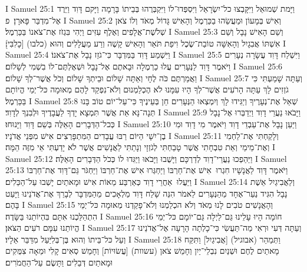 I Samuel 25:1	וַיָּמת שְׁמוּאֵל וַיִּקָּבְצוּ כל־יִשְׂרָאֵל וַיִּסְפְּדוּ־לוֹ וַיִּקְבְּרֻהוּ בְּבֵיתוֹ בָּרָמָה וַיָּקם דָּוִד וַיֵּרֶד אֶל־מִדְבַּר פָּארָן׃ {פ}
I Samuel 25:2	וְאִישׁ בְּמָעוֹן וּמַעֲשֵׂהוּ בַכַּרְמֶל וְהָאִישׁ גָּדוֹל מְאֹד וְלוֹ צֹאן שְׁלֹשֶׁת־אֲלָפִים וְאֶלֶף עִזִּים וַיְהִי בִּגְזֹז אֶת־צֹאנוֹ בַּכַּרְמֶל׃
I Samuel 25:3	וְשֵׁם הָאִישׁ נָבָל וְשֵׁם אִשְׁתּוֹ אֲבִגָיִל וְהָאִשָּׁה טוֹבַת־שֶׂכֶל וִיפַת תֹּאַר וְהָאִישׁ קָשֶׁה וְרַע מַעֲלָלִים וְהוּא (כלבו) [כָלִבִּי]׃
I Samuel 25:4	וַיִּשְׁמַע דָּוִד בַּמִּדְבָּר כִּי־גֹזֵז נָבָל אֶת־צֹאנוֹ׃
I Samuel 25:5	וַיִּשְׁלַח דָּוִד עֲשָׂרָה נְעָרִים וַיֹּאמֶר דָּוִד לַנְּעָרִים עֲלוּ כַרְמֶלָה וּבָאתֶם אֶל־נָבָל וּשְׁאֶלְתֶּם־לוֹ בִשְׁמִי לְשָׁלוֹם׃
I Samuel 25:6	וַאֲמַרְתֶּם כֹּה לֶחָי וְאַתָּה שָׁלוֹם וּבֵיתְךָ שָׁלוֹם וְכֹל אֲשֶׁר־לְךָ שָׁלוֹם׃
I Samuel 25:7	וְעַתָּה שָׁמַעְתִּי כִּי גֹזְזִים לָךְ עַתָּה הָרֹעִים אֲשֶׁר־לְךָ הָיוּ עִמָּנוּ לֹא הֶכְלַמְנוּם וְלֹא־נִפְקַד לָהֶם מְאוּמָה כּל־יְמֵי הֱיוֹתָם בַּכַּרְמֶל׃
I Samuel 25:8	שְׁאַל אֶת־נְעָרֶיךָ וְיַגִּידוּ לָךְ וְיִמְצְאוּ הַנְּעָרִים חֵן בְּעֵינֶיךָ כִּי־עַל־יוֹם טוֹב בָּנוּ תְּנָה־נָּא אֵת אֲשֶׁר תִּמְצָא יָדְךָ לַעֲבָדֶיךָ וּלְבִנְךָ לְדָוִד׃
I Samuel 25:9	וַיָּבֹאוּ נַעֲרֵי דָוִד וַיְדַבְּרוּ אֶל־נָבָל כְּכל־הַדְּבָרִים הָאֵלֶּה בְּשֵׁם דָּוִד וַיָּנוּחוּ׃
I Samuel 25:10	וַיַּעַן נָבָל אֶת־עַבְדֵי דָוִד וַיֹּאמֶר מִי דָוִד וּמִי בֶן־יִשָׁי הַיּוֹם רַבּוּ עֲבָדִים הַמִּתְפָּרְצִים אִישׁ מִפְּנֵי אֲדֹנָיו׃
I Samuel 25:11	וְלָקַחְתִּי אֶת־לַחְמִי וְאֶת־מֵימַי וְאֵת טִבְחָתִי אֲשֶׁר טָבַחְתִּי לְגֹזְזָי וְנָתַתִּי לַאֲנָשִׁים אֲשֶׁר לֹא יָדַעְתִּי אֵי מִזֶּה הֵמָּה׃
I Samuel 25:12	וַיַּהַפְכוּ נַעֲרֵי־דָוִד לְדַרְכָּם וַיָּשֻׁבוּ וַיָּבֹאוּ וַיַּגִּדוּ לוֹ כְּכֹל הַדְּבָרִים הָאֵלֶּה׃
I Samuel 25:13	וַיֹּאמֶר דָּוִד לַאֲנָשָׁיו חִגְרוּ  אִישׁ אֶת־חַרְבּוֹ וַיַּחְגְּרוּ אִישׁ אֶת־חַרְבּוֹ וַיַּחְגֹּר גַּם־דָּוִד אֶת־חַרְבּוֹ וַיַּעֲלוּ  אַחֲרֵי דָוִד כְּאַרְבַּע מֵאוֹת אִישׁ וּמָאתַיִם יָשְׁבוּ עַל־הַכֵּלִים׃
I Samuel 25:14	וְלַאֲבִיגַיִל אֵשֶׁת נָבָל הִגִּיד נַעַר־אֶחָד מֵהַנְּעָרִים לֵאמֹר הִנֵּה שָׁלַח דָּוִד מַלְאָכִים  מֵהַמִּדְבָּר לְבָרֵךְ אֶת־אֲדֹנֵינוּ וַיָּעַט בָּהֶם׃
I Samuel 25:15	וְהָאֲנָשִׁים טֹבִים לָנוּ מְאֹד וְלֹא הכְלַמְנוּ וְלֹא־פָקַדְנוּ מְאוּמָה כּל־יְמֵי הִתְהַלַּכְנוּ אִתָּם בִּהְיוֹתֵנוּ בַּשָּׂדֶה׃
I Samuel 25:16	חוֹמָה הָיוּ עָלֵינוּ גַּם־לַיְלָה גַּם־יוֹמָם כּל־יְמֵי הֱיוֹתֵנוּ עִמָּם רֹעִים הַצֹּאן׃
I Samuel 25:17	וְעַתָּה דְּעִי וּרְאִי מַה־תַּעֲשִׂי כִּי־כָלְתָה הָרָעָה אֶל־אֲדֹנֵינוּ וְעַל כּל־בֵּיתוֹ וְהוּא בֶּן־בְּלִיַּעַל מִדַּבֵּר אֵלָיו׃
I Samuel 25:18	וַתְּמַהֵר (אבוגיל) [אֲבִיגַיִל] וַתִּקַּח מָאתַיִם לֶחֶם וּשְׁנַיִם נִבְלֵי־יַיִן וְחָמֵשׁ צֹאן (עשוות) [עֲשׂוּיוֹת] וְחָמֵשׁ סְאִים קָלִי וּמֵאָה צִמֻּקִים וּמָאתַיִם דְּבֵלִים וַתָּשֶׂם עַל־הַחֲמֹרִים׃
